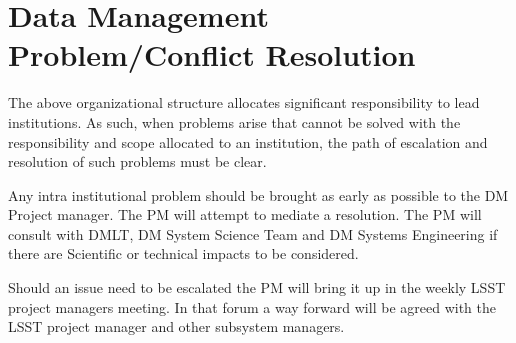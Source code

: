 \section{Data Management Problem/Conflict Resolution }
The above organizational structure allocates significant responsibility to lead institutions.  As such, when problems arise that cannot be solved with the responsibility and scope allocated to an institution, the path of escalation and resolution of such problems must be clear.

Any intra institutional problem should be brought as early as possible to the DM Project manager. The PM will attempt to mediate a resolution. The PM will consult with DMLT, DM System Science Team and DM Systems Engineering if there are Scientific or technical impacts to be considered.

Should an issue need to be escalated the PM will bring it up in the weekly LSST project managers meeting.
In that forum a way forward will be agreed with the LSST project manager and other subsystem managers.
